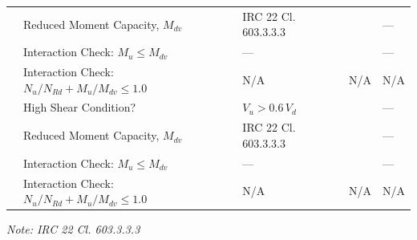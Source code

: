 \documentclass[12pt,a4paper]{report}
\numberwithin{figure}{chapter}
\begin{document}
\begin{longtable}{|C{2.36cm}|L{3.4cm}|L{2.86cm}|C{2.25cm}|C{2.36cm}|}
 & Reduced Moment Capacity, $M_{dv}$ & IRC 22 Cl. 603.3.3.3 &  & --- \\*
 & Interaction Check: $M_u \leq M_{dv}$ & --- &  & --- \\*
 & Interaction Check: $N_u/N_{Rd} + M_u/M_{dv} \leq 1.0$ & N/A & N/A & N/A \\
\hline
{}
 & High Shear Condition? & $V_u > 0.6\,V_d$ &  & --- \\*
 & Reduced Moment Capacity, $M_{dv}$ & IRC 22 Cl. 603.3.3.3 &  & --- \\*
 & Interaction Check: $M_u \leq M_{dv}$ & --- &  & --- \\*
 & Interaction Check: $N_u/N_{Rd} + M_u/M_{dv} \leq 1.0$ & N/A & N/A & N/A \\
\hline
\end{longtable}
\noindent\textit{Note: IRC 22 Cl. 603.3.3.3}
\end{document}
